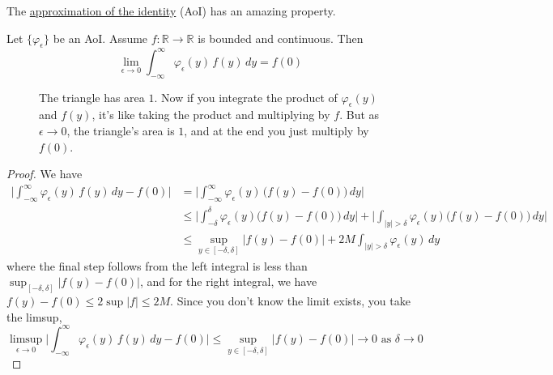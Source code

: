   The \hyperref[def:approximation-of-the-identity]{approximation of the identity} (AoI) has an amazing property. 

  \begin{theorem}
    \label{thm:aoi-assume-bounded-continuous-triangle}
    Let $\{\varphi_\epsilon\}$ be an AoI. Assume $f: \mathbb{R} \to \mathbb{R}$ is bounded and continuous. Then 
    \begin{equation}
      \lim_{\epsilon \to 0} \int_{-\infty}^\infty \varphi_\epsilon (y) \, f(y) \,dy = f(0)
    \end{equation}

    \begin{figure}[H]
      \centering 
      \caption{The triangle has area $1$. Now if you integrate the product of $\varphi_\epsilon (y)$ and $f(y)$, it's like taking the product and multiplying by $f$. But as $\epsilon \to 0$, the triangle's area is $1$, and at the end you just multiply by $f(0)$. } 
      \label{fig:aoi}
    \end{figure}
  \end{theorem}
  \begin{proof}
    We have 
    \begin{align}
      \bigg| \int_{-\infty}^\infty \varphi_\epsilon (y) \, f(y) \,dy - f(0) \bigg| & = \bigg| \int_{-\infty}^\infty \varphi_\epsilon (y) \, \big( f(y) - f(0) \big) \,dy \bigg| \\ 
                                                                                   & \leq \bigg| \int_{-\delta}^{\delta} \varphi_\epsilon (y) \big( f(y) - f(0) \big) \,dy \bigg| + \bigg| \int_{|y| > \delta} \varphi_\epsilon (y) \big( f(y) - f(0) \big) \,dy \bigg| \\ 
                                                                                   & \leq \sup_{y \in [-\delta, \delta]} |f(y) - f(0)| + 2 M \int_{|y| > \delta} \varphi_\epsilon (y) \,dy 
    \end{align}
    where the final step follows from the left integral is less than $\sup_{[-\delta, \delta]} |f(y) - f(0)|$, and for the right integral, we have $f(y) - f(0) \leq 2 \sup |f| \leq 2 M$. Since you don't know the limit exists, you take the limsup, 
    \begin{equation}
      \limsup_{\epsilon \to 0} \bigg| \int_{-\infty}^\infty \varphi_\epsilon (y) \, f(y) \,dy - f(0) \bigg| \leq \sup_{y \in [-\delta, \delta]} |f(y) - f(0)| \to 0 \text{ as } \delta \to 0
    \end{equation}
  \end{proof}

